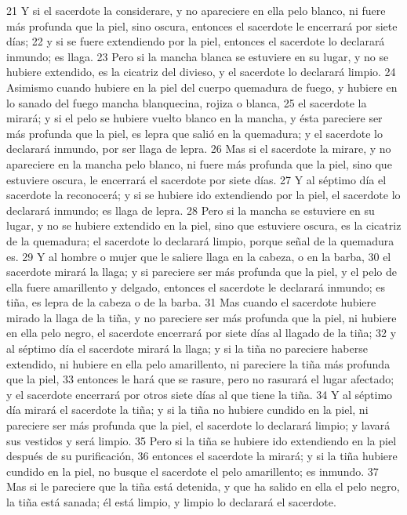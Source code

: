 21 Y si el sacerdote la considerare, y no apareciere en ella pelo blanco, ni fuere más profunda que la piel, sino oscura, entonces el sacerdote le encerrará por siete días;
22 y si se fuere extendiendo por la piel, entonces el sacerdote lo declarará inmundo; es llaga.
23 Pero si la mancha blanca se estuviere en su lugar, y no se hubiere extendido, es la cicatriz del divieso, y el sacerdote lo declarará limpio.
24 Asimismo cuando hubiere en la piel del cuerpo quemadura de fuego, y hubiere en lo sanado del fuego mancha blanquecina, rojiza o blanca,
25 el sacerdote la mirará; y si el pelo se hubiere vuelto blanco en la mancha, y ésta pareciere ser más profunda que la piel, es lepra que salió en la quemadura; y el sacerdote lo declarará inmundo, por ser llaga de lepra.
26 Mas si el sacerdote la mirare, y no apareciere en la mancha pelo blanco, ni fuere más profunda que la piel, sino que estuviere oscura, le encerrará el sacerdote por siete días.
27 Y al séptimo día el sacerdote la reconocerá; y si se hubiere ido extendiendo por la piel, el sacerdote lo declarará inmundo; es llaga de lepra.
28 Pero si la mancha se estuviere en su lugar, y no se hubiere extendido en la piel, sino que estuviere oscura, es la cicatriz de la quemadura; el sacerdote lo declarará limpio, porque señal de la quemadura es.
29 Y al hombre o mujer que le saliere llaga en la cabeza, o en la barba,
30 el sacerdote mirará la llaga; y si pareciere ser más profunda que la piel, y el pelo de ella fuere amarillento y delgado, entonces el sacerdote le declarará inmundo; es tiña, es lepra de la cabeza o de la barba.
31 Mas cuando el sacerdote hubiere mirado la llaga de la tiña, y no pareciere ser más profunda que la piel, ni hubiere en ella pelo negro, el sacerdote encerrará por siete días al llagado de la tiña;
32 y al séptimo día el sacerdote mirará la llaga; y si la tiña no pareciere haberse extendido, ni hubiere en ella pelo amarillento, ni pareciere la tiña más profunda que la piel,
33 entonces le hará que se rasure, pero no rasurará el lugar afectado; y el sacerdote encerrará por otros siete días al que tiene la tiña.
34 Y al séptimo día mirará el sacerdote la tiña; y si la tiña no hubiere cundido en la piel, ni pareciere ser más profunda que la piel, el sacerdote lo declarará limpio; y lavará sus vestidos y será limpio.
35 Pero si la tiña se hubiere ido extendiendo en la piel después de su purificación,
36 entonces el sacerdote la mirará; y si la tiña hubiere cundido en la piel, no busque el sacerdote el pelo amarillento; es inmundo.
37 Mas si le pareciere que la tiña está detenida, y que ha salido en ella el pelo negro, la tiña está sanada; él está limpio, y limpio lo declarará el sacerdote.

